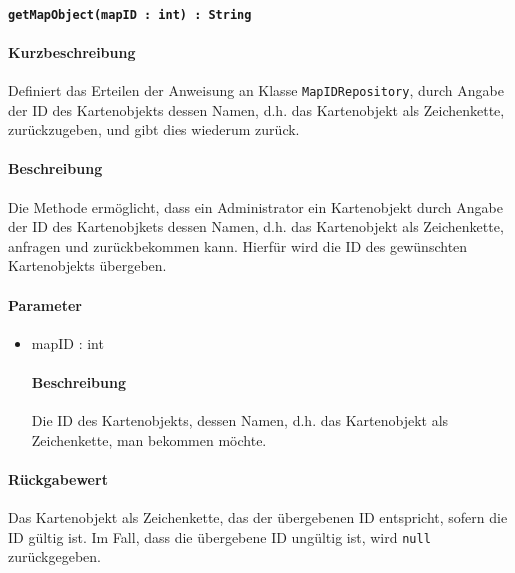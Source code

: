 \paragraph{\texttt{getMapObject(mapID : int) : String}}%
\paragraph*{Kurzbeschreibung}
Definiert das Erteilen der Anweisung an Klasse \texttt{MapIDRepository}, durch Angabe der ID des Kartenobjekts dessen Namen, d.h. das Kartenobjekt als Zeichenkette, zurückzugeben, und gibt dies wiederum zurück.
\paragraph*{Beschreibung}
Die Methode ermöglicht, dass ein Administrator ein Kartenobjekt durch Angabe der ID des Kartenobjkets dessen Namen, d.h. das Kartenobjekt als Zeichenkette, anfragen und zurückbekommen kann.
Hierfür wird die ID des gewünschten Kartenobjekts übergeben.
\paragraph*{Parameter}
\begin{itemize}
    \item mapID : int
    		\paragraph*{Beschreibung}
    		Die ID des Kartenobjekts, dessen Namen, d.h. das Kartenobjekt als Zeichenkette, man bekommen möchte.
\end{itemize}
\paragraph*{Rückgabewert}
Das Kartenobjekt als Zeichenkette, das der übergebenen ID entspricht, sofern die ID gültig ist.
Im Fall, dass die übergebene ID ungültig ist, wird \texttt{null} zurückgegeben.
